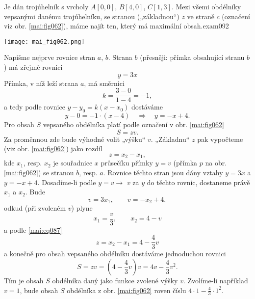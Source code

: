 \begin{mathexam}{Je dán trojúhelník s vrcholy \(A[0, 0]\), \(B[4, 0]\), \(C[1, 3]\). Mezi všemi
  obdélníky vepsanými danému trojúhelníku, se stranou („základnou“) \(z\) ve straně \(c\) (označení
  viz obr. \ref{mai:fig062}), máme najít ten, který má maximální obsah.}{exam092}

  {\centering
    \captionsetup{type=figure}
    \texttt{[image: mai\_fig062.png]} 
    \label{mai:fig062}
  \par}
  
  Napišme nejprve rovnice stran \(a\), \(b\). Strana \(b\) (přesněji: přímka obsahující stranu
  \(b\)) má zřejmě rovnici
  \begin{equation*}
    y = 3x
  \end{equation*}
  Přímka, v níž leží strana \(a\), má směrnici
  \begin{equation*}
    k = \dfrac{3-0}{1-4} = -1,
  \end{equation*}
  a tedy podle rovnice \(y-y_0 = k(x-x_0)\) dostáváme 
  \begin{equation*}
    y - 0 = -1\cdot(x - 4) \quad\Rightarrow\quad y = -x + 4.  
  \end{equation*}
  Pro obsah \(S\) vepsaného obdélníka platí podle označení v obr. \ref{mai:fig062} 
  \begin{equation*}
    S = zv.
  \end{equation*}
  Za proměnnou zde bude výhodné volit „výšku“ \(v\). „Základnu“ \(z\) pak vypočteme (viz obr.
  \ref{mai:fig062}) jako rozdíl
  \begin{equation}\label{mai:eq087}
    z = x_2 - x_1,
  \end{equation}
  kde \(x_1\), resp. \(x_2\) je souřadnice \(x\) průsečíku přímky \(y = v\) (přímka \(p\) na obr.
  \ref{mai:fig062}) se stranou \(b\), resp. \(a\). Rovnice těchto stran jsou dány vztahy \(y = 3x\)
  a \(y = -x + 4\). Dosadíme-li podle \(y = v\rightarrow\)  \(v\) za \(y\) do těchto rovnic,
  dostaneme právě \(x_1\) a \(x_2\). Bude
  \begin{equation*}
    v = 3x_1, \qquad v = -x_2 + 4,
  \end{equation*}
  odkud (při zvoleném \(v\)) plyne
  \begin{equation*}
    x_1 = \dfrac{v}{3}, \qquad  x_2 = 4 - v 
  \end{equation*}
  a podle \ref{mai:eq087}
  \begin{equation*}
    z = x_2 - x_1 =  4 - \dfrac{4}{3}v
  \end{equation*}
  a konečně pro obsah vepsaného obdélníku dostáváme jednoduchou rovnici
  \begin{equation}\label{mai:eq088}
    S = zv = \left(4 - \dfrac{4}{3}v\right)v = 4v - \dfrac{4}{3}v^2.
  \end{equation} 
  Tím je obsah \(S\) obdélníka daný jako funkce zvolené výšky \(v\). Zvolíme-li například \(v=1\),
  bude obsah \(S\) obdélníka z obr. \ref{mai:fig062} roven číslu \(4\cdot1 - \frac{4}{3}\cdot1^2\). 
  

\end{mathexam}
